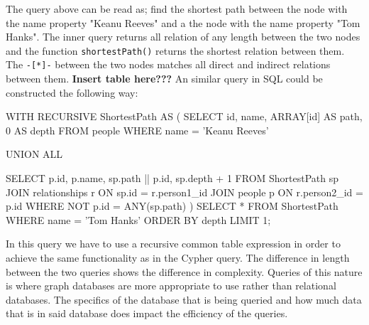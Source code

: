 The query above can be read as; find the shortest path between the node with the name property "Keanu Reeves" and a the node with the name property "Tom Hanks". The inner query returns all relation of any length between the two nodes and the function \texttt{shortestPath()} returns the shortest relation between them. The \texttt{-[*]-} between the two nodes matches all direct and indirect relations between them. \textbf{Insert table here???} An similar query in SQL could be constructed the following way:
\begin{sqlCode}
WITH RECURSIVE ShortestPath AS (
  SELECT
    id,
    name,
    ARRAY[id] AS path,
    0 AS depth
  FROM
    people
  WHERE
    name = 'Keanu Reeves'

  UNION ALL

  SELECT
    p.id,
    p.name,
    sp.path || p.id,
    sp.depth + 1
  FROM
    ShortestPath sp
  JOIN
    relationships r ON sp.id = r.person1_id
  JOIN
    people p ON r.person2_id = p.id
  WHERE
    NOT p.id = ANY(sp.path) 
)
SELECT *
FROM ShortestPath
WHERE name = 'Tom Hanks'
ORDER BY depth
LIMIT 1;

\end{sqlCode}
In this query we have to use a recursive common table expression in order to achieve the same functionality as in the Cypher query. The difference in length between the two queries shows the difference in complexity. Queries of this nature is where graph databases are more appropriate to use rather than relational databases. The specifics of the database that is being queried and how much data that is in said database does impact the efficiency of the queries.




